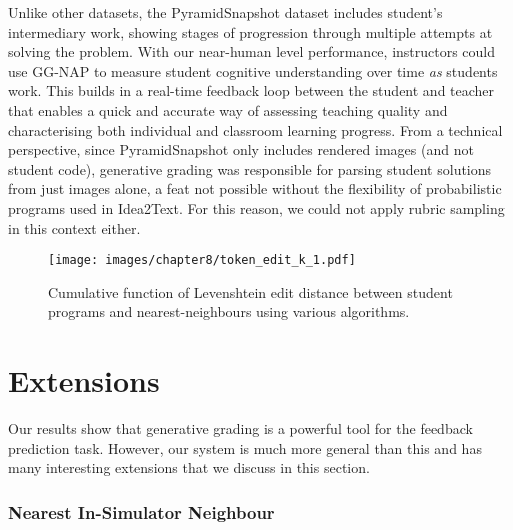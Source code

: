 Unlike other datasets, the PyramidSnapshot dataset includes student's intermediary work, showing stages of progression through multiple attempts at solving the problem. With our near-human level performance, instructors could use GG-NAP to measure student cognitive understanding over time \textit{as} students work. This builds in a real-time feedback loop between the student and teacher that enables a quick and accurate way of assessing teaching quality and characterising both individual and classroom learning progress. From a technical perspective, since PyramidSnapshot only includes rendered images (and not student code), generative grading was responsible for parsing student solutions from just images alone, a feat not possible without the flexibility of probabilistic programs used in Idea2Text. For this reason, we could not apply rubric sampling in this context either.


\begin{figure}[t!]
    \centering
    \texttt{[image: images/chapter8/token\_edit\_k\_1.pdf]}
    \caption{Cumulative function of Levenshtein edit distance between student programs and nearest-neighbours using various algorithms.}
    \label{fig:liftoff_edit_dist}
\end{figure}

\section{Extensions}
\label{sec:extensions}

Our results show that generative grading is a powerful tool for the feedback prediction task. However, our system is much more general than this and has many interesting extensions that we discuss in this section.

\subsubsection{Nearest In-Simulator Neighbour}
\label{sec:nearest_neighbour}

